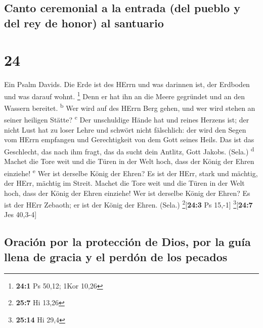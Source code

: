 \hypertarget{canto-ceremonial-a-la-entrada-del-pueblo-y-del-rey-de-honor-al-santuario}{%
\subsection{Canto ceremonial a la entrada (del pueblo y del rey de
honor) al
santuario}\label{canto-ceremonial-a-la-entrada-del-pueblo-y-del-rey-de-honor-al-santuario}}

\hypertarget{section-23}{%
\section{24}\label{section-23}}

 Ein Psalm Davids. Die Erde ist des HErrn und was darinnen
ist, der Erdboden und was darauf wohnt. \footnote{\textbf{24:1} Ps
  50,12; 1Kor 10,26}  Denn er hat ihn an die Meere
gegründet und an den Wassern bereitet. \textsuperscript{b}
 Wer wird auf des HErrn Berg gehen, und wer wird stehen an
seiner heiligen Stätte? \textsuperscript{c}  Der
unschuldige Hände hat und reines Herzens ist; der nicht Lust hat zu
loser Lehre und schwört nicht fälschlich:  der wird den
Segen vom HErrn empfangen und Gerechtigkeit von dem Gott seines Heils.
 Das ist das Geschlecht, das nach ihm fragt, das da sucht
dein Antlitz, Gott Jakobs. (Sela.) \textsuperscript{d} 
Machet die Tore weit und die Türen in der Welt hoch, dass der König der
Ehren einziehe! \textsuperscript{e}  Wer ist derselbe
König der Ehren? Es ist der HErr, stark und mächtig, der HErr, mächtig
im Streit.  Machet die Tore weit und die Türen in der Welt
hoch, dass der König der Ehren einziehe!  Wer ist
derselbe König der Ehren? Es ist der HErr Zebaoth; er ist der König der
Ehren. (Sela.) \footnote{\textbf{25:7} Hi 13,26}{[}\textbf{24:3} Ps
15,-1{]} \footnote{\textbf{25:14} Hi 29,4}{[}\textbf{24:7} Jes 40,3-4{]}

\hypertarget{oraciuxf3n-por-la-protecciuxf3n-de-dios-por-la-guuxeda-llena-de-gracia-y-el-perduxf3n-de-los-pecados}{%
\subsection{Oración por la protección de Dios, por la guía llena de
gracia y el perdón de los
pecados}\label{oraciuxf3n-por-la-protecciuxf3n-de-dios-por-la-guuxeda-llena-de-gracia-y-el-perduxf3n-de-los-pecados}}

